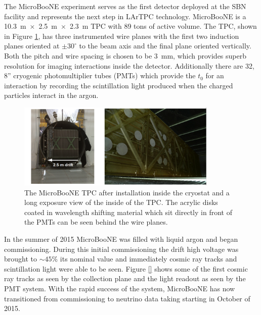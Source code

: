 
The MicroBooNE experiment serves as the first detector deployed at the SBN facility and represents the next step in LArTPC technology. MicroBooNE is a 10.3~m~$\times$~2.5~m~$\times$~2.3~m TPC with 89 tons of active volume. The TPC, shown in Figure \ref{fig:uboone}, has three instrumented wire planes with the first two induction planes oriented at $\pm 30^{\circ}$ to the beam axis and the final plane oriented vertically. Both the pitch and wire spacing is chosen to be 3~mm, which provides superb resolution for imaging interactions inside the detector. Additionally there are 32, 8'' cryogenic photomultiplier tubes (PMTs) which provide the $t_{0}$ for an interaction by recording the scintillation light produced when the charged particles interact in the argon.

\begin{figure}[htb]
\centering
\includegraphics[width=0.85\textwidth]{images/microboone.png}
\caption[]{The MicroBooNE TPC after installation inside the cryostat and a long exposure view of the inside of the TPC. The acrylic disks coated in wavelength shifting material which sit directly in front of the PMTs can be seen behind the wire planes.}
\label{fig:uboone}
\end{figure}

In the summer of 2015 MicroBooNE was filled with liquid argon and began commissioning. During this initial commissioning the drift high voltage was brought to $\sim 45\%$ its nominal value and immediately cosmic ray tracks and scintillation light were able to be seen. Figure \ref{} shows some of the first cosmic ray tracks as seen by the collection plane and the light readout as seen by the PMT system. With the rapid success of the system, MicroBooNE has now transitioned from commissioning to neutrino data taking starting in October of 2015. 


